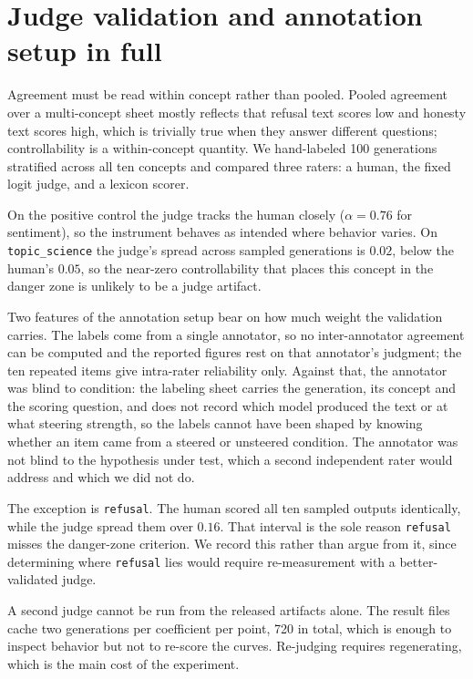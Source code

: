 \documentclass{article}
\begin{document}
\section{Judge validation and annotation setup in full}
\label{app:limits}

Agreement must be read within concept rather than pooled. Pooled agreement over
a multi-concept sheet mostly reflects that refusal text scores low and honesty
text scores high, which is trivially true when they answer different questions;
controllability is a within-concept quantity. We hand-labeled 100 generations
stratified across all ten concepts and compared three raters: a human, the fixed
logit judge, and a lexicon scorer.

On the positive control the judge tracks the human closely ($\alpha = 0.76$ for
sentiment), so the instrument behaves as intended where behavior varies. On
\texttt{topic\_science} the judge's spread across sampled generations is $0.02$,
below the human's $0.05$, so the near-zero controllability that places this
concept in the danger zone is unlikely to be a judge artifact.

Two features of the annotation setup bear on how much weight the validation
carries. The labels come from a single annotator, so no inter-annotator
agreement can be computed and the reported figures rest on that annotator's
judgment; the ten repeated items give intra-rater reliability only. Against
that, the annotator was blind to condition: the labeling sheet carries the
generation, its concept and the scoring question, and does not record which
model produced the text or at what steering strength, so the labels cannot have
been shaped by knowing whether an item came from a steered or unsteered
condition. The annotator was not blind to the hypothesis under test, which a
second independent rater would address and which we did not do.

The exception is \texttt{refusal}. The human scored all ten sampled outputs
identically, while the judge spread them over $0.16$. That interval is the sole
reason \texttt{refusal} misses the danger-zone criterion. We record this rather
than argue from it, since determining where \texttt{refusal} lies would require
re-measurement with a better-validated judge.

A second judge cannot be run from the released artifacts alone. The result files
cache two generations per coefficient per point, 720 in total, which is enough
to inspect behavior but not to re-score the curves. Re-judging requires
regenerating, which is the main cost of the experiment.
\end{document}
